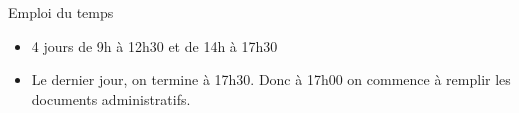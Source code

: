 \begin{frame}{Emploi du temps}
  \begin{itemize}
  \item 4 jours de 9h à 12h30 et de 14h à 17h30
  \item Le dernier jour, on termine à 17h30.
    Donc à 17h00 on commence à remplir les documents administratifs.
  \end{itemize}
\end{frame}

